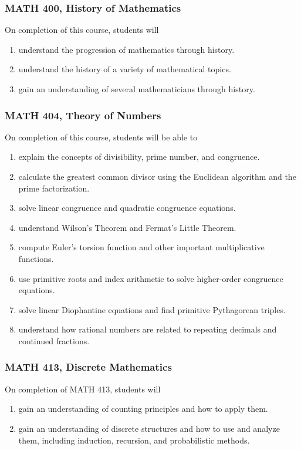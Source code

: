 \documentclass[11pt]{article}
\newenvironment{alphalist}{
\begin{enumerate}[label=(\arabic*),widest=107 ,leftmargin=25pt, itemsep=0pt]}
{\end{enumerate}}
\begin{document}
\subsubsection{MATH 400, History of Mathematics}

On completion of this course, students will 
\begin{alphalist}
    \item understand the progression of mathematics through history.
    \item understand the history of a variety of mathematical topics.
    \item gain an understanding of several mathematicians through history.
\end{alphalist}

\subsubsection{MATH 404, Theory of Numbers}

On completion of this course, students will be able to
\begin{alphalist}
    \item explain the concepts of divisibility, prime number, and congruence. 
    \item calculate the greatest common divisor using the Euclidean algorithm and the prime factorization.
    \item solve linear congruence and quadratic congruence equations.
    \item understand Wilson's Theorem and Fermat's Little Theorem. 
    \item compute Euler's torsion function and other important multiplicative functions.
    \item use primitive roots and index arithmetic to solve higher-order congruence equations.  
    \item solve linear Diophantine equations and find primitive Pythagorean triples.
    \item understand how rational numbers are related to repeating decimals and continued fractions.
\end{alphalist}

\subsubsection{MATH 413, Discrete Mathematics}

On completion of MATH 413, students will 
\begin{alphalist}
    \item gain an understanding of counting principles and how to apply them.
    \item gain an understanding of discrete structures and how to use and analyze them, including induction, recursion, and probabilistic methods.
\end{alphalist}
\end{document}
